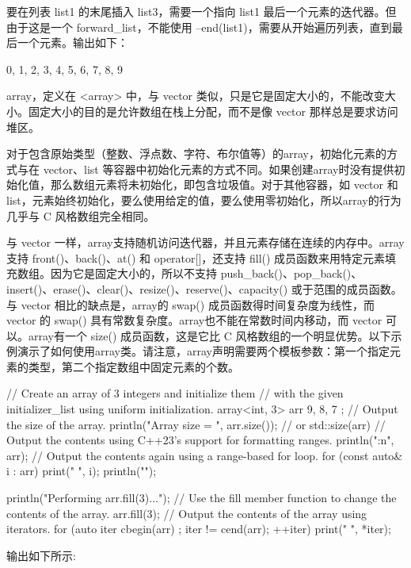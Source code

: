 要在列表 list1 的末尾插入 list3，需要一个指向 list1 最后一个元素的迭代器。但由于这是一个 forward\_list，不能使用 --end(list1)，需要从开始遍历列表，直到最后一个元素。输出如下：

\begin{shell}
0, 1, 2, 3, 4, 5, 6, 7, 8, 9
\end{shell}


array，定义在 <array> 中，与 vector 类似，只是它是固定大小的，不能改变大小。固定大小的目的是允许数组在栈上分配，而不是像 vector 那样总是要求访问堆区。

对于包含原始类型（整数、浮点数、字符、布尔值等）的array，初始化元素的方式与在 vector、list 等容器中初始化元素的方式不同。如果创建array时没有提供初始化值，那么数组元素将未初始化，即包含垃圾值。对于其他容器，如 vector 和 list，元素始终初始化，要么使用给定的值，要么使用零初始化，所以array的行为几乎与 C 风格数组完全相同。

与 vector 一样，array支持随机访问迭代器，并且元素存储在连续的内存中。array支持 front()、back()、at() 和 operator[]，还支持 fill() 成员函数来用特定元素填充数组。因为它是固定大小的，所以不支持 push\_back()、pop\_back()、insert()、erase()、clear()、resize()、reserve()、capacity() 或于范围的成员函数。与 vector 相比的缺点是，array的 swap() 成员函数得时间复杂度为线性，而 vector 的 swap() 具有常数复杂度。array也不能在常数时间内移动，而 vector 可以。array有一个 size() 成员函数，这是它比 C 风格数组的一个明显优势。以下示例演示了如何使用array类。请注意，array声明需要两个模板参数：第一个指定元素的类型，第二个指定数组中固定元素的个数。

\begin{cpp}
// Create an array of 3 integers and initialize them
// with the given initializer_list using uniform initialization.
array<int, 3> arr { 9, 8, 7 };
// Output the size of the array.
println("Array size = {}", arr.size()); // or std::size(arr)
// Output the contents using C++23's support for formatting ranges.
println("{:n}", arr);
// Output the contents again using a range-based for loop.
for (const auto& i : arr) { print("{} ", i); }
println("");

println("Performing arr.fill(3)...");
// Use the fill member function to change the contents of the array.
arr.fill(3);
// Output the contents of the array using iterators.
for (auto iter { cbegin(arr) }; iter != cend(arr); ++iter) {
    print("{} ", *iter);
}
\end{cpp}

输出如下所示:

